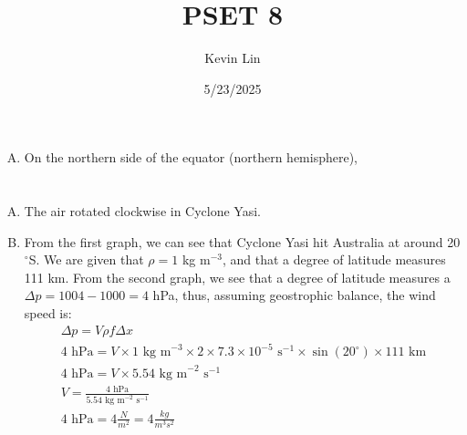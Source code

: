 \documentclass[11pt,a4paper,margin=1in]{article}
\title{PSET 8}
\author{Kevin Lin}
\date{5/23/2025}
\begin{document}
\maketitle
\section{}
\begin{enumerate}[A.]
    \item 
    On the northern side of the equator (northern hemisphere), 
\end{enumerate}

\section{}
\begin{enumerate}[A.]
    \item 
    The air rotated clockwise in Cyclone Yasi.
    \item 
    From the first graph, we can see that Cyclone Yasi hit Australia at around 
    20$^{\circ}$S. We are given that $\rho = 1$ kg m$^{-3}$, and that a degree of
    latitude measures 111 km. From the second graph, we see that a degree of
    latitude measures a $\Delta p = 1004 - 1000 = 4$ hPa, thus, assuming 
    geostrophic balance, the wind speed is:
    \begin{gather*}
        \Delta p = V \rho f \Delta x \\
        4 \text{ hPa} = V \times 1 \text{ kg m}^{-3} \times 2 \times 7.3 \times
            10^{-5} \text{ s}^{-1} \times \sin(20^{\circ}) \times 111 \text{ km} \\
        4 \text{ hPa} = V \times 5.54 \text{ kg m}^{-2} \text{ s}^{-1} \\
        V = \frac{4 \text{ hPa}}{5.54 \text{ kg m}^{-2} \text{ s}^{-1}} \\
        4 \text{ hPa} = 4 \frac{N}{m^2} = 4 \frac{kg}{m^3 s^2} \\
    \end{gather*}
\end{enumerate}
\end{document}
